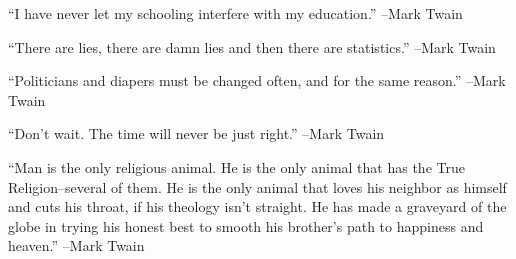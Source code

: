 \documentclass{article}%
\begin{document}
\linebreak%
\vspace{1mm}%
\begin{minipage}{\textwidth}%
\flushleft%
“I have never let my schooling interfere with my education.”%
\linebreak%
\vspace{1mm}%
–Mark Twain%
\linebreak%
\vspace{1mm}%
\end{minipage}%
\linebreak%
\vspace{1mm}%
\begin{minipage}{\textwidth}%
\flushleft%
“There are lies, there are damn lies and then there are statistics.”%
\linebreak%
\vspace{1mm}%
–Mark Twain%
\linebreak%
\vspace{1mm}%
\end{minipage}%
\linebreak%
\vspace{1mm}%
\begin{minipage}{\textwidth}%
\flushleft%
“Politicians and diapers must be changed often, and for the same reason.”%
\linebreak%
\vspace{1mm}%
–Mark Twain%
\linebreak%
\vspace{1mm}%
\end{minipage}%
\linebreak%
\vspace{1mm}%
\begin{minipage}{\textwidth}%
\flushleft%
“Don't wait. The time will never be just right.”%
\linebreak%
\vspace{1mm}%
–Mark Twain%
\linebreak%
\vspace{1mm}%
\end{minipage}%
\linebreak%
\vspace{1mm}%
\begin{minipage}{\textwidth}%
\flushleft%
“Man is the only religious animal. He is the only animal that has the True Religion–several of them. He is the only animal that loves his neighbor as himself and cuts his throat, if his theology isn't straight. He has made a graveyard of the globe in trying his honest best to smooth his brother's path to happiness and heaven.”%
\linebreak%
\vspace{1mm}%
–Mark Twain%
\linebreak%
\vspace{1mm}%
\end{minipage}%
\end{document}

